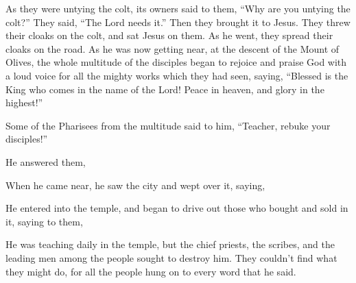 {As they were untying the colt, its owners said to them, “Why are you untying the colt?”
They said, “The Lord needs it.”
Then they brought it to Jesus. They threw their cloaks on the colt, and sat Jesus on them.
As he went, they spread their cloaks on the road.
As he was now getting near, at the descent of the Mount of Olives, the whole multitude of the disciples began to rejoice and praise God with a loud voice for all the mighty works which they had seen,
saying, “Blessed is the King who comes in the name of the Lord!
 Peace in heaven, and glory in the highest!”
\par }{\PP {}Some of the Pharisees from the multitude said to him, “Teacher, rebuke your disciples!”
\par }{\PP {}He answered them,
{}
\par }{\PP {}When he came near, he saw the city and wept over it,
saying,
{}
\par }{\PP {}He entered into the temple, and began to drive out those who bought and sold in it,
saying to them,
{}
{}
\par }{\PP {}He was teaching daily in the temple, but the chief priests, the scribes, and the leading men among the people sought to destroy him.
They couldn’t find what they might do, for all the people hung on to every word that he said.

}
